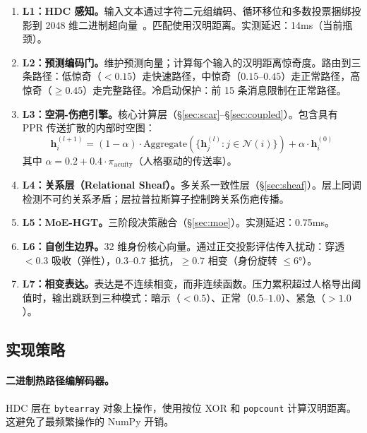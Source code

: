 \documentclass[11pt]{article}
\begin{document}
\begin{enumerate}[leftmargin=*]
\item \textbf{L1：HDC 感知。}输入文本通过字符二元组编码、循环移位和多数投票捆绑投影到 2048 维二进制超向量~\cite{kanerva2009}。匹配使用汉明距离。实测延迟：14ms（当前瓶颈）。

\item \textbf{L2：预测编码门。}维护预测向量；计算每个输入的汉明距离惊奇度。路由到三条路径：低惊奇（$< 0.15$）走快速路径，中惊奇（$0.15$--$0.45$）走正常路径，高惊奇（$\geq 0.45$）走完整路径。冷启动保护：前 15 条消息限制在正常路径。

\item \textbf{L3：空洞-伤疤引擎。}核心计算层（\S\ref{sec:scar}--\S\ref{sec:coupled}）。包含具有 PPR 传送扩散的内部时空图：
\begin{equation}
\mathbf{h}_i^{(l+1)} = (1-\alpha) \cdot \text{Aggregate}(\{\mathbf{h}_j^{(l)} : j \in \mathcal{N}(i)\}) + \alpha \cdot \mathbf{h}_i^{(0)}
\end{equation}
其中 $\alpha = 0.2 + 0.4 \cdot \pi_{\text{acuity}}$（人格驱动的传送率）。

\item \textbf{L4：关系层（Relational Sheaf）。}多关系一致性层（\S\ref{sec:sheaf}）。层上同调检测不可约关系矛盾；层拉普拉斯算子控制跨关系伤疤传播。

\item \textbf{L5：MoE-HGT。}三阶段决策融合（\S\ref{sec:moe}）。实测延迟：0.75ms。

\item \textbf{L6：自创生边界。}32 维身份核心向量。通过正交投影评估传入扰动：穿透 $< 0.3$ 吸收（弹性），$0.3$--$0.7$ 抵抗，$\geq 0.7$ 相变（身份旋转 $\leq 6°$）。

\item \textbf{L7：相变表达。}表达是不连续相变，而非连续函数。压力累积超过人格导出阈值时，输出跳跃到三种模式：暗示（$< 0.5$）、正常（$0.5$--$1.0$）、紧急（$> 1.0$）。
\end{enumerate}

\subsection{实现策略}

\paragraph{二进制热路径编解码器。}HDC 层在 \texttt{bytearray} 对象上操作，使用按位 XOR 和 \texttt{popcount} 计算汉明距离。这避免了最频繁操作的 NumPy 开销。
\end{document}
